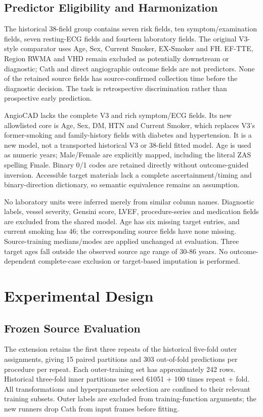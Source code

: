\documentclass[conference]{IEEEtran}
\begin{document}
\subsection{Predictor Eligibility and Harmonization}
The historical 38-field group contains seven risk fields, ten symptom/examination fields, seven resting-ECG fields and fourteen laboratory fields. The original V3-style comparator uses Age, Sex, Current Smoker, EX-Smoker and FH. EF-TTE, Region RWMA and VHD remain excluded as potentially downstream or diagnostic; Cath and direct angiographic outcome fields are not predictors. None of the retained source fields has source-confirmed collection time before the diagnostic decision. The task is retrospective discrimination rather than prospective early prediction.

AngioCAD lacks the complete V3 and rich symptom/ECG fields. Its new allowlisted core is Age, Sex, DM, HTN and Current Smoker, which replaces V3's former-smoking and family-history fields with diabetes and hypertension. It is a new model, not a transported historical V3 or 38-field fitted model. Age is used as numeric years; Male/Female are explicitly mapped, including the literal ZAS spelling Fmale. Binary 0/1 codes are retained directly without outcome-guided inversion. Accessible target materials lack a complete ascertainment/timing and binary-direction dictionary, so semantic equivalence remains an assumption.

No laboratory units were inferred merely from similar column names. Diagnostic labels, vessel severity, Gensini score, LVEF, procedure-series and medication fields are excluded from the shared model. Age has six missing target entries, and current smoking has 46; the corresponding source fields have none missing. Source-training medians/modes are applied unchanged at evaluation. Three target ages fall outside the observed source age range of 30-86 years. No outcome-dependent complete-case exclusion or target-based imputation is performed.

\section{Experimental Design}
\subsection{Frozen Source Evaluation}
The extension retains the first three repeats of the historical five-fold outer assignments, giving 15 paired partitions and 303 out-of-fold predictions per procedure per repeat. Each outer-training set has approximately 242 rows. Historical three-fold inner partitions use seed 61051 + 100 times repeat + fold. All transformations and hyperparameter selection are confined to their relevant training subsets. Outer labels are excluded from training-function arguments; the new runners drop Cath from input frames before fitting.
\end{document}
